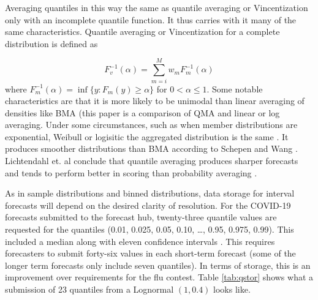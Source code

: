 \documentclass{article}\usepackage[]{graphicx}\usepackage[]{color}
\begin{document}
Averaging quantiles in this way the same as quantile averaging or Vincentization
only with an incomplete quantile function. It thus carries with it many of the
same characteristics.
Quantile averaging or Vincentization for a complete distribution is defined as 

\begin{equation}
\label{eq:vinc}
  F_v^{-1}(\alpha) = \sum_{m=i}^M w_m F_m^{-1} (\alpha)
\end{equation}
where $F_m^{-1} (\alpha) = \inf \{y:F_m(y) \geq \alpha\}$ for 
$0 < \alpha \leq 1$. Some notable characteristics are that it is more likely
to be unimodal than linear averaging of densities like BMA 
\cite{busetti2017quantile} (this paper is a comparison of QMA and 
linear or log averaging. Under some circumstances, such as when member
distributions are exponential, Weibull or logisitic the aggregated distribution
is the same \cite{ratcliff1979group}. It produces smoother
distributions than BMA according to Schepen and Wang \cite{schepen2015model}.
Lichtendahl et. al conclude that quantile averaging produces sharper forecasts
and tends to perform better in scoring than probability averaging
\cite{lichtendahl2013better}.

As in sample distributions and binned distributions, 
data storage for interval forecasts will
depend on the desired clarity of resolution. For the COVID-19 forecasts 
submitted to the forecast hub, twenty-three quantile values are requested for 
the quantiles (0.01, 0.025, 0.05, 0.10, …, 0.95, 0.975, 0.99). This included a 
median along with eleven confidence intervals \cite{bracher2021evaluating}. This
requires forecasters to submit forty-six values in each short-term forecast 
(some of the longer term forecasts only include seven quantiles). In terms of 
storage, this is an improvement over requirements for the flu contest. Table
\ref{tab:qstor} shows what a submission of 23 quantiles from a 
Lognormal $(1,0.4)$ looks like.



\end{document}
